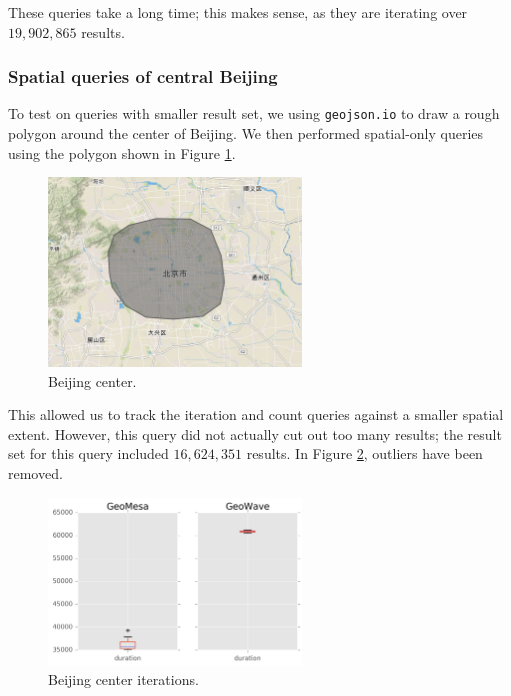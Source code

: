 These queries take a long time; this makes sense, as they are iterating over $19,902,865$ results.

\subsubsection{Spatial queries of central Beijing}

To test on queries with smaller result set, we using \texttt{geojson.io} to draw a rough polygon around the center of Beijing.
We then performed spatial-only queries using the polygon shown in Figure \ref{beijingcenter}.

\begin{figure}[h!tb]
  \centering
  \includegraphics[width=0.60\textwidth]{../docs/img/beijing-center.png}
  \caption{Beijing center.}
  \label{beijingcenter}
\end{figure}

This allowed us to track the iteration and count queries against a smaller spatial extent.
However, this query did not actually cut out too many results; the result set for this query included $16,624,351$ results.
In Figure \ref{beijingcenteriterate}, outliers have been removed.

\begin{figure}[h!tb]
  \centering
  \includegraphics[width=0.60\textwidth]{../docs/img/geolife-beijing-center-iterate.png}
  \caption{Beijing center iterations.}
  \label{beijingcenteriterate}
\end{figure}

